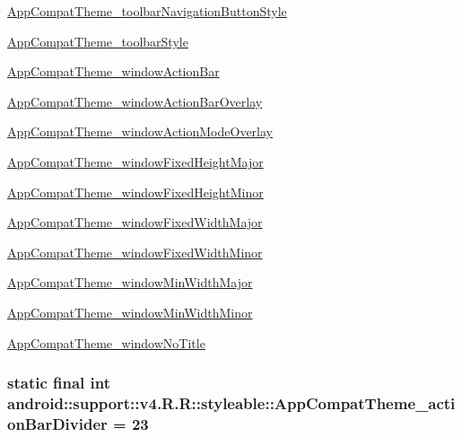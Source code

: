\begin{Desc}
\hyperlink{classandroid_1_1support_1_1v4_1_1_r_1_1styleable_87064f8d46222440c979de60d377ca13}{AppCompatTheme\_\-toolbarNavigationButtonStyle} 

\hyperlink{classandroid_1_1support_1_1v4_1_1_r_1_1styleable_81c6c79a79be93a353a8d86869ec3c42}{AppCompatTheme\_\-toolbarStyle} 

\hyperlink{classandroid_1_1support_1_1v4_1_1_r_1_1styleable_8831994a0d23fc63a5a2b0ebf86c8780}{AppCompatTheme\_\-windowActionBar} 

\hyperlink{classandroid_1_1support_1_1v4_1_1_r_1_1styleable_924250499a476f5492258c6e60c451f7}{AppCompatTheme\_\-windowActionBarOverlay} 

\hyperlink{classandroid_1_1support_1_1v4_1_1_r_1_1styleable_1edd340eee109030db65f7a0873156ea}{AppCompatTheme\_\-windowActionModeOverlay} 

\hyperlink{classandroid_1_1support_1_1v4_1_1_r_1_1styleable_bf982bf851eb06a495f5ea786cf2972e}{AppCompatTheme\_\-windowFixedHeightMajor} 

\hyperlink{classandroid_1_1support_1_1v4_1_1_r_1_1styleable_b7b787b3482486bcf6134e26f3f79737}{AppCompatTheme\_\-windowFixedHeightMinor} 

\hyperlink{classandroid_1_1support_1_1v4_1_1_r_1_1styleable_307ec462d988be66e4bf9bd5ef416bc4}{AppCompatTheme\_\-windowFixedWidthMajor} 

\hyperlink{classandroid_1_1support_1_1v4_1_1_r_1_1styleable_0de992b88b66a205f256dcedf020c78e}{AppCompatTheme\_\-windowFixedWidthMinor} 

\hyperlink{classandroid_1_1support_1_1v4_1_1_r_1_1styleable_73b62d7534ce501813e6dcf984016df4}{AppCompatTheme\_\-windowMinWidthMajor} 

\hyperlink{classandroid_1_1support_1_1v4_1_1_r_1_1styleable_43bc5686bdcae44e39f9c6bac931d7ea}{AppCompatTheme\_\-windowMinWidthMinor} 

\hyperlink{classandroid_1_1support_1_1v4_1_1_r_1_1styleable_8b1c22084adcad0c0271c952798a1a61}{AppCompatTheme\_\-windowNoTitle} \end{Desc}
\hypertarget{classandroid_1_1support_1_1v4_1_1_r_1_1styleable_a5d8289303e56212e5d12315d20673e4}{
\subsubsection[{AppCompatTheme\_\-actionBarDivider}]{\setlength{\rightskip}{0pt plus 5cm}static final int android::support::v4.R.R::styleable::AppCompatTheme\_\-actionBarDivider = 23}}
\label{classandroid_1_1support_1_1v4_1_1_r_1_1styleable_a5d8289303e56212e5d12315d20673e4}


